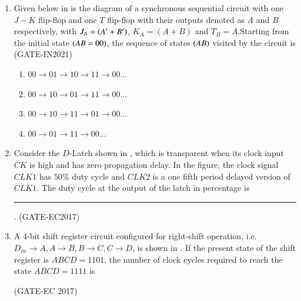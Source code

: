 \begin{enumerate}[label=\arabic*.,ref=\theenumi]
 \item Given below 
in
	 is the diagram of a synchronous sequential circuit with one $J-K$ flip-flop and one $T$ flip-flop with their outputs denoted as $A$ and $B$ respectively, with $J_{A}=\left(A^{\prime}+B^{\prime}\right)$, $K_{A}=(A+B)$ and $T_{B}=A$.Starting from the initial state $\left(AB=00\right)$, the sequence of states $\left(AB\right)$ visited by the circuit is
\hfill(GATE-IN2021)
	\begin{figure}[H]
    \centering
    \resizebox{0.75\columnwidth}{!}{%
		      
		      }
		      \caption{}
		      \label{fig:GATE-IN2021}
	      \end{figure}
		  \begin{enumerate}
          \item $00 \rightarrow 01 \rightarrow 10 \rightarrow 11 \rightarrow 00 
          \dots $
          \item $00 \rightarrow 10 \rightarrow 01 \rightarrow 11 \rightarrow 00 
          \dots $
          \item $00 \rightarrow 10 \rightarrow 11 \rightarrow 01 \rightarrow 00 \dots $
          \item $00 \rightarrow 01 \rightarrow 11 \rightarrow 00 \dots $
      \end{enumerate}
  \item Consider the $D$-Latch shown in 
	,
		which is transparent when its clock input $CK$ is high and has zero propagation delay. In the figure, the clock signal $CLK1$ has $50\%$ duty cycle and $CLK2$ is a one fifth period delayed version of $CLK1$. The duty cycle at the output of the latch in percentage is \rule{1cm}{1pt}.
  \hfill(GATE-EC2017)
	\begin{figure}[H]
    \centering
    \resizebox{0.75\columnwidth}{!}{%
			      
	}
    \caption{}
	\label{fig:GATE-EC2017}
\end{figure}
\item A $4$-bit shift register circuit configured for right-shift operation, i.e.\\ $D_{in} \rightarrow A, A \rightarrow B, B \rightarrow C, C \rightarrow D$, is shown
	in .
 If the present state of the shift register is $ABCD = 1101$, the number of clock cycles required to reach the state $ABCD = 1111$ is

\hfill (GATE-EC 2017)
	\begin{figure}[H]
    \centering
    \resizebox{0.75\columnwidth}{!}{%
	
		}
 	\caption{}
	\label{fig:GATE-EC-2017}
\end{figure}


\end{enumerate}
